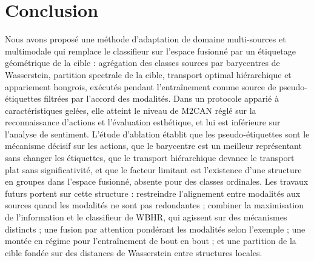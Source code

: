 \documentclass[11pt,a4paper]{article}
\theoremstyle{definition}
\theoremstyle{remark}
\begin{document}
\section{Conclusion}\label{sec-conclusion}

Nous avons proposé une méthode d'adaptation de domaine multi-sources et multimodale qui remplace le classifieur sur
l'espace fusionné par un étiquetage géométrique de la cible : agrégation des classes sources par barycentres de
Wasserstein, partition spectrale de la cible, transport optimal hiérarchique et appariement hongrois, exécutés pendant
l'entraînement comme source de pseudo-étiquettes filtrées par l'accord des modalités. Dans un protocole apparié à
caractéristiques gelées, elle atteint le niveau de M2CAN réglé sur la reconnaissance d'actions et l'évaluation
esthétique, et lui est inférieure sur l'analyse de sentiment. L'étude d'ablation établit que les pseudo-étiquettes sont
le mécanisme décisif sur les actions, que le barycentre est un meilleur représentant sans changer les étiquettes, que le
transport hiérarchique devance le transport plat sans significativité, et que le facteur limitant est l'existence d'une
structure en groupes dans l'espace fusionné, absente pour des classes ordinales. Les travaux futurs portent sur cette
structure : restreindre l'alignement entre modalités aux sources quand les modalités ne sont pas redondantes ; combiner
la maximisation de l'information et le classifieur de WBHR, qui agissent sur des mécanismes distincts ; une fusion par
attention pondérant les modalités selon l'exemple ; une montée en régime pour l'entraînement de bout en bout ; et une
partition de la cible fondée sur des distances de Wasserstein entre structures locales.



\end{document}
